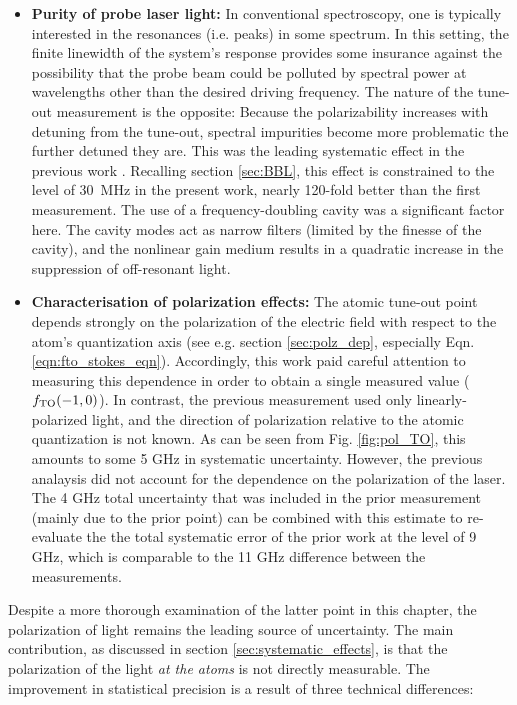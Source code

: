 	\begin{itemize}	
		\item \textbf{Purity of probe laser light:} In conventional spectroscopy, one is typically interested in the resonances (i.e. peaks) in some spectrum. In this setting, the finite linewidth of the system's response provides some insurance against the possibility that the probe beam could be polluted by spectral power at wavelengths other than the desired driving frequency. The nature of the tune-out measurement is the opposite: Because the polarizability increases with detuning from the tune-out, spectral impurities become more problematic the further detuned they are. This was the leading systematic effect in the previous work \cite{Henson15}. Recalling section \ref{sec:BBL}, this effect is constrained to the level of 30~MHz in the present work, nearly 120-fold better than the first measurement. The use of a frequency-doubling cavity was a significant factor here. The cavity modes act as narrow filters (limited by the finesse of the cavity), and the nonlinear gain medium results in a quadratic increase in the suppression of off-resonant light.
		\item \textbf{Characterisation of polarization effects:}  The atomic tune-out point depends strongly on the polarization of the electric field with respect to the atom's quantization axis (see e.g. section \ref{sec:polz_dep}, especially Eqn. \ref{eqn:fto_stokes_eqn}). Accordingly, this work paid careful attention to measuring this dependence in order to obtain a single measured  value ($f_\mathrm{TO}(-1,0)$). In contrast, the previous measurement used only linearly-polarized light, and the direction of polarization relative to the atomic quantization is not known. As can be seen from Fig. \ref{fig:pol_TO}, this amounts to some 5 GHz in systematic uncertainty. However, the previous analaysis did not account for the dependence on the polarization of the laser.  The 4 GHz total uncertainty that was included in the prior measurement (mainly due to the prior point) can be combined with this estimate to re-evaluate the the total systematic error of the prior work at the level of 9 GHz, which is comparable to the 11 GHz difference between the measurements. 
	\end{itemize}	

	Despite a more thorough examination of the latter point in this chapter, the polarization of light remains the leading source of uncertainty. The main contribution, as discussed in section \ref{sec:systematic_effects}, is that the polarization of the light \emph{at the atoms} is not directly measurable. The improvement in statistical precision is a result of three technical differences:

